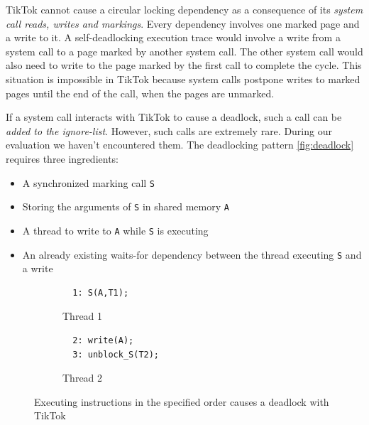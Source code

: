\documentclass[conference]{IEEEtran}
\newcommand{\sysname}{TikTok}
\begin{document}
\sysname{} cannot cause a circular locking dependency as a consequence of its
\emph{system call reads, writes and markings}. Every dependency involves one
marked page and a write to it. A self-deadlocking execution trace would involve
a write from a system call to a page marked by another system call. The other
system call would also need to write to the page marked by the first call to
complete the cycle. This situation is impossible in \sysname{} because system
calls postpone writes to marked pages until the end of the call, when the pages
are unmarked.

If a system call interacts with \sysname{} to cause a deadlock, such a call can
be \emph{added to the ignore-list}. However, such calls are extremely rare.
During our evaluation we haven't encountered them. The deadlocking pattern
\autoref{fig:deadlock} requires three ingredients:

\begin{itemize}
  \item A synchronized marking call \texttt{S}
  \item Storing the arguments of \texttt{S} in shared memory \texttt{A}
  \item A thread to write to \texttt{A} while \texttt{S} is executing
  \item An already existing waits-for dependency between the thread executing
  \texttt{S} and a write
\end{itemize}

\begin{figure}
  \centering
  \begin{subfigure}[b]{0.45\linewidth}
  \begin{minipage}{\linewidth}
  \begin{lstlisting}
  1: S(A,T1);  
  \end{lstlisting}
  \end{minipage}
  \caption{Thread 1}
  \end{subfigure}
  \hfill
  \begin{subfigure}[b]{0.45\linewidth}
  \begin{minipage}{\linewidth}
  \begin{lstlisting}
  2: write(A);
  3: unblock_S(T2);
  \end{lstlisting}  
  \end{minipage}
  \caption{Thread 2}
  \end{subfigure}
  \caption{Executing instructions in the specified order causes a deadlock with \sysname}
  \label{fig:deadlock}
\end{figure}
\end{document}
